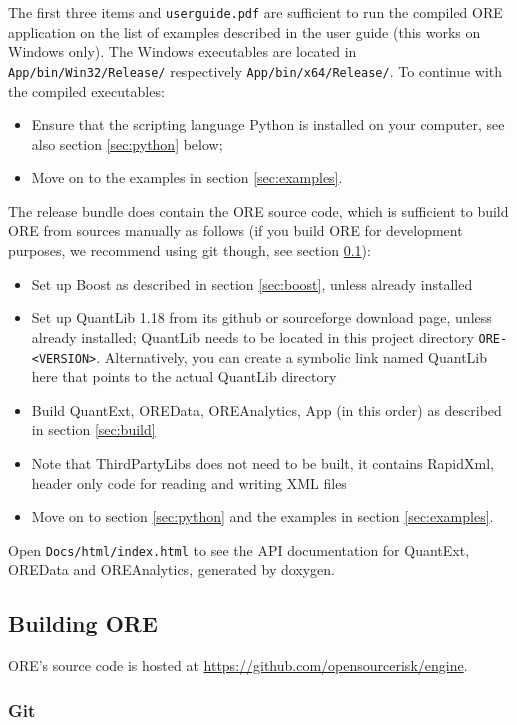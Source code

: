 \documentclass[12pt, a4paper]{article}
\begin{document}
The first three items and {\tt userguide.pdf} are sufficient to run the compiled ORE application
on the list of examples described in the user guide (this works on Windows only). The Windows executables are located in {\tt App/bin/Win32/Release/} respectively {\tt App/bin/x64/Release/}. To continue with the compiled
executables:
\begin{itemize}
\item Ensure that the scripting language Python is installed on your computer, see also section \ref{sec:python}
  below;
\item Move on to the examples in section \ref{sec:examples}.
\end{itemize}

\medskip
The release bundle does contain the ORE source code, which is sufficient to build ORE from sources manually as follows (if you build ORE for development purposes, we recommend using git though, see section \ref{sec:build_ore}):
\begin{itemize}
\item Set up Boost as described in section \ref{sec:boost}, unless already installed
\item Set up QuantLib 1.18 \cite{QL,quantlib-install} from its github or sourceforge download page, unless already
  installed; QuantLib needs to be located in this project directory {\tt ORE-<VERSION>}. Alternatively, you can create a
  symbolic link named QuantLib here that points to the actual QuantLib directory
\item Build QuantExt, OREData, OREAnalytics, App (in this order) as described in section \ref{sec:build}
\item Note that ThirdPartyLibs does not need to be built, it contains RapidXml, header only code for reading and
  writing XML files
\item Move on to section \ref{sec:python} and the examples in section \ref{sec:examples}.
\end{itemize}

Open {\tt Docs/html/index.html} to see the API documentation for QuantExt, OREData and OREAnalytics, generated by
doxygen.

\subsection{Building ORE}\label{sec:build_ore}

ORE's source code is hosted at \url{https://github.com/opensourcerisk/engine}.

\subsubsection{Git}
\end{document}
